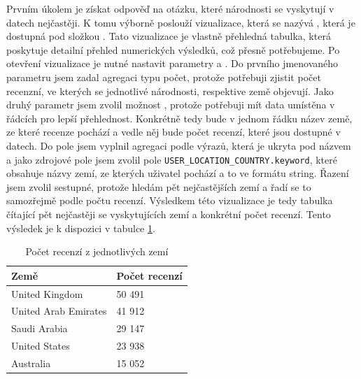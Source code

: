 \documentclass[czech,BP]{thesiskiv}
\begin{document}
Prvním úkolem je získat odpověď na otázku, které národnosti se vyskytují v datech nejčastěji. K tomu výborně poslouží vizualizace, která se nazývá , která je dostupná pod složkou . Tato vizualizace je vlastně přehledná tabulka, která poskytuje detailní přehled numerických výsledků, což přesně potřebujeme. Po otevření vizualizace je nutné nastavit parametry  a . Do prvního jmenovaného parametru jsem zadal agregaci typu počet, protože potřebuji zjistit počet recenzní, ve kterých se jednotlivé národnosti, respektive země objevují. Jako druhý parametr jsem zvolil možnost , protože potřebuji mít data umístěna v řádcích pro lepší přehlednost. Konkrétně tedy bude v jednom řádku název země, ze které recenze pochází a vedle něj bude počet recenzí, které jsou dostupné v datech. Do pole  jsem vyplnil agregaci podle výrazů, která je ukryta pod názvem  a jako zdrojové pole jsem zvolil pole \texttt{USER\_LOCATION\_COUNTRY.keyword}, které obsahuje názvy zemí, ze kterých uživatel pochází a to ve formátu string. Řazení jsem zvolil sestupné, protože hledám pět nejčastějších zemí a řadí se to samozřejmě podle počtu recenzí. Výsledkem této vizualizace je tedy tabulka čítající pět nejčastěji se vyskytujících zemí a konkrétní počet recenzí. Tento výsledek je k dispozici v tabulce \ref{Pocet_zeme}.

\begin{table}[ht]
	\centering
	\begin{tabular}{l|l}
		
		\textbf{Země}        & \textbf{Počet recenzí} \\ \hline
		United Kingdom       & 50 491                 \\ 
		United Arab Emirates & 41 912                 \\ 
		Saudi Arabia         & 29 147                 \\ 
		United States        & 23 938                 \\ 
		Australia            & 15 052                 \\ 
	\end{tabular}
	\caption{Počet recenzí z jednotlivých zemí}
	\label{Pocet_zeme}
\end{table}
\end{document}
